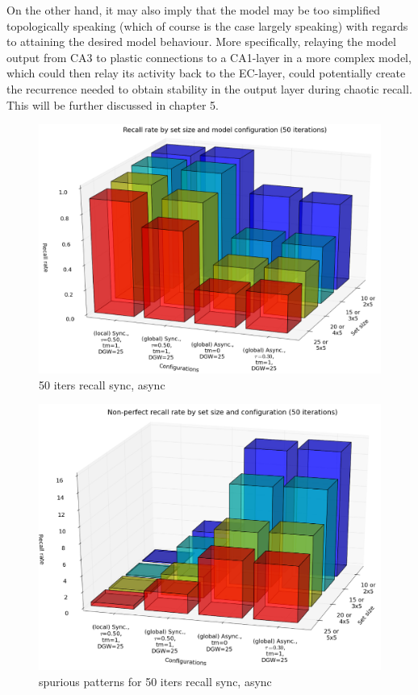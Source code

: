 On the other hand, it may also imply that the model may be too simplified topologically speaking (which of course is the case largely speaking) with regards to attaining the desired model behaviour. More specifically, relaying the model output from CA3 to plastic connections to a CA1-layer in a more complex model, which could then relay its activity back to the EC-layer, could potentially create the recurrence needed to obtain stability in the output layer during chaotic recall. This will be further discussed in chapter 5.

\begin{figure}
    \centering
    \includegraphics[width=13cm]{fig/i-iters/50-iters-recall}
    \caption{50 iters recall sync, async}
    \label{fig:50-iters-recall}
\end{figure}

\begin{figure}
    \centering
    \includegraphics[width=13cm]{fig/i-iters/50-iters-recall-spurious}
    \caption{spurious patterns for 50 iters recall sync, async}
    \label{fig:50-iters-recall-spurious}
\end{figure}

